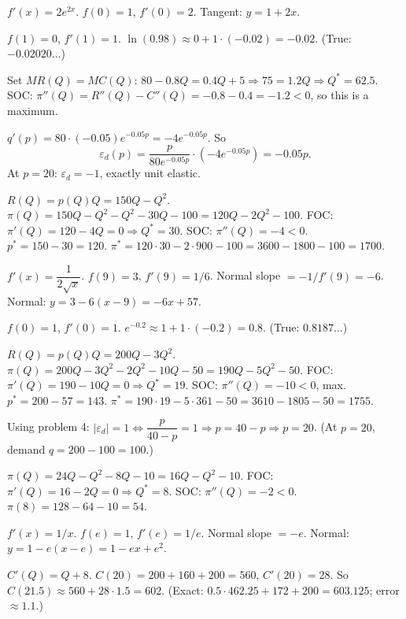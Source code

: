 \begin{solutions}
  \item $f'(x)=2e^{2x}$. $f(0)=1$, $f'(0)=2$. Tangent: $y=1+2x$.

  \item $f(1)=0$, $f'(1)=1$. $\ln(0.98)\approx0+1\cdot(-0.02)=-0.02$.
        (True: $-0.02020\ldots$)

  \item Set $MR(Q)=MC(Q)$: $80-0.8Q=0.4Q+5\Rightarrow75=1.2Q\Rightarrow
        Q^*=62.5$. SOC: $\pi''(Q)=R''(Q)-C''(Q)=-0.8-0.4=-1.2<0$, so this
        is a maximum.

  \item $q'(p)=80\cdot(-0.05)e^{-0.05p}=-4e^{-0.05p}$. So
        \[
          \varepsilon_d(p)=\frac{p}{80e^{-0.05p}}\cdot(-4e^{-0.05p})
            =-0.05p .
        \]
        At $p=20$: $\varepsilon_d=-1$, exactly unit elastic.

  \item $R(Q)=p(Q)Q=150Q-Q^2$.
        $\pi(Q)=150Q-Q^2-Q^2-30Q-100=120Q-2Q^2-100$. FOC:
        $\pi'(Q)=120-4Q=0\Rightarrow Q^*=30$. SOC: $\pi''(Q)=-4<0$.
        $p^*=150-30=120$. $\pi^*=120\cdot30-2\cdot900-100
        =3600-1800-100=1700$.

  \item $f'(x)=\dfrac{1}{2\sqrt{x}}$. $f(9)=3$, $f'(9)=1/6$. Normal slope
        $=-1/f'(9)=-6$. Normal: $y=3-6(x-9)=-6x+57$.

  \item $f(0)=1$, $f'(0)=1$. $e^{-0.2}\approx1+1\cdot(-0.2)=0.8$. (True:
        $0.8187\ldots$)

  \item $R(Q)=p(Q)Q=200Q-3Q^2$.
        $\pi(Q)=200Q-3Q^2-2Q^2-10Q-50=190Q-5Q^2-50$. FOC:
        $\pi'(Q)=190-10Q=0\Rightarrow Q^*=19$. SOC: $\pi''(Q)=-10<0$, max.
        $p^*=200-57=143$. $\pi^*=190\cdot19-5\cdot361-50
        =3610-1805-50=1755$.

  \item Using problem 4: $|\varepsilon_d|=1 \Leftrightarrow
        \dfrac{p}{40-p}=1\Rightarrow p=40-p\Rightarrow p=20$. (At $p=20$,
        demand $q=200-100=100$.)

  \item $\pi(Q)=24Q-Q^2-8Q-10=16Q-Q^2-10$. FOC:
        $\pi'(Q)=16-2Q=0\Rightarrow Q^*=8$. SOC: $\pi''(Q)=-2<0$.
        $\pi(8)=128-64-10=54$.

  \item $f'(x)=1/x$. $f(e)=1$, $f'(e)=1/e$. Normal slope $=-e$. Normal:
        $y=1-e(x-e)=1-ex+e^2$.

  \item $C'(Q)=Q+8$. $C(20)=200+160+200=560$, $C'(20)=28$. So
        $C(21.5)\approx560+28\cdot1.5=602$. (Exact:
        $0.5\cdot462.25+172+200=603.125$; error $\approx1.1$.)


\end{solutions}
